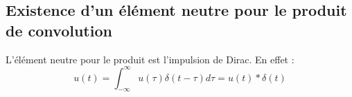 	\subsection{Existence d'un élément neutre pour le produit de convolution}
	L'élément neutre pour le produit est l'impulsion de Dirac. En effet :
	\begin{equation}
	u(t) = \int_{-\infty}^\infty u(\tau)\delta(t-\tau)d\tau = u(t)*\delta(t)
	\end{equation}

































